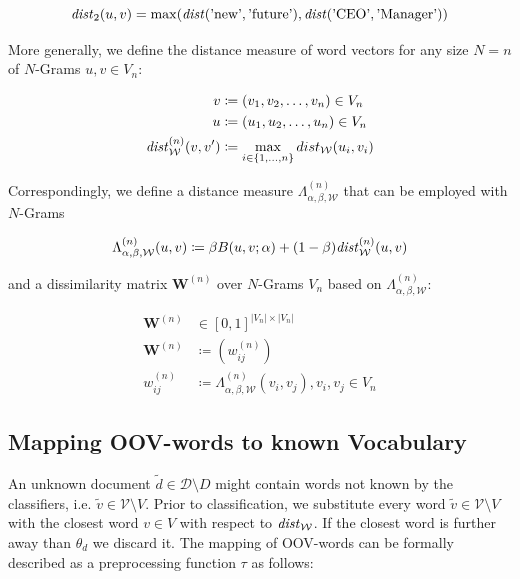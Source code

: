 \begin{equation*}
	\mathit{dist}_2(u,v) = \max(\mathit{dist}(\text{'new'}, \text{{'future'}}),
	\mathit{dist}(\text{'CEO'}, \text{'Manager')})
\end{equation*}

More generally, we define the distance measure of word vectors for any size
$N=n$ of $N$-Grams $u,v \in V_n$:

\begin{equation*}
\begin{split}
	v &\coloneqq (v_1,v_2,\ldots,v_n) \in V_n \\
	u &\coloneqq (u_1,u_2,\ldots,u_n) \in V_n \\
	\mathit{dist}_\mathcal{W}^{(n)}(v,v') &\coloneqq \max\limits_{i \in \left\{
	1,\ldots, n \right\}} dist_\mathcal{W}(u_i, v_i)
\end{split}
\end{equation*}

Correspondingly, we define a distance measure
$\Lambda^{(n)}_{\alpha,\beta,\mathcal{W}}$ that can be employed with $N$-Grams

\begin{equation*}
\Lambda_{\alpha,\beta,\mathcal{W}}^{(n)}(u,v) \coloneqq \beta B(u,v; \alpha) +
(1-\beta)\mathit{dist}_\mathcal{W}^{(n)}(u,v)
\end{equation*}

and a dissimilarity matrix  $\mathbf{W}^{(n)}$ over $N$-Grams $V_n$ based
on $\Lambda_{\alpha,\beta,\mathcal{W}}^{(n)}$:

\begin{equation*}
\begin{split}
	\mathbf{W}^{(n)} &\in [0,1]^{|V_n|\times|V_n|} \\
	\mathbf{W}^{(n)} &\coloneqq \left(w^{(n)}_{ij}\right) \\
	w^{(n)}_{ij} &\coloneqq \Lambda_{\alpha,\beta,\mathcal{W}}^{(n)}(v_i,v_j), v_i,
	v_j \in V_n
\end{split}
\end{equation*}

\subsection{Mapping OOV-words to known Vocabulary}
\label{ssec:oov-automated}
An unknown document $\tilde{d} \in \mathcal{D}\setminus D$ might contain words not
known by the classifiers, i.e. $\tilde{v} \in \mathcal{V}\setminus V$. Prior to
classification, we substitute every word $\tilde{v} \in
\mathcal{V} \setminus V$ with the closest word $v \in V$ with respect
to $\mathit{dist}_\mathcal{W}$. If the closest word is further away than $\theta_d$
we discard it. The mapping of OOV-words can be formally described as a preprocessing function $\tau$ as follows:

